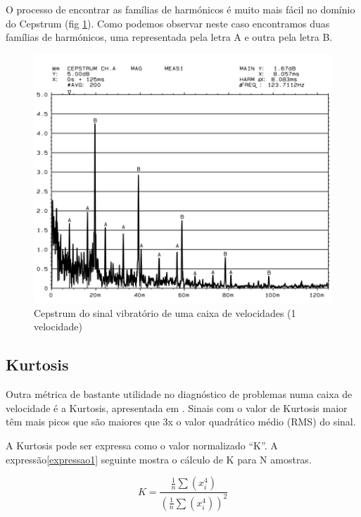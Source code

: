 O processo de encontrar as famílias de harmónicos é muito mais fácil no domínio do Cepstrum (fig \ref{spectrum Cepstrum2}). Como podemos observar neste caso encontramos duas famílias de harmónicos, uma representada pela letra A e outra pela letra B.


\begin{figure}[H]
\centering
\includegraphics[scale=0.35]{figs/spectrum_cepstrum2}
\caption{Cepstrum do sinal vibratório de uma caixa de velocidades (1 velocidade)}\label{spectrum Cepstrum2}
\end{figure}

\subsection{Kurtosis}

Outra métrica de bastante utilidade no diagnóstico de problemas numa caixa de velocidade é a Kurtosis, apresentada em \cite{Kurtosis}. Sinais com o valor de Kurtosis maior têm mais picos que são maiores que 3x o valor quadrático médio (RMS) do sinal.

A Kurtosis pode ser expressa como o valor normalizado ``K''. A expressão\ref{expressao1} seguinte mostra o cálculo de K para N amostras.


\begin{equation}	
	K = \frac{\frac{1}{n}\sum \left ( x_{i}^{4} \right )}{(\frac{1}{n}\sum (x_{i}^{4}))^{2}}
\label{expressao1}
\end{equation}

